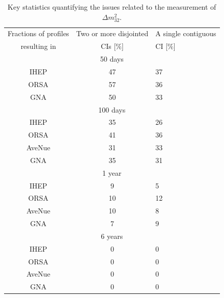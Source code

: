 \begin{table}[h!]
  \centering
  \caption{Key statistics quantifying the issues related to the measurement of $\Delta m^2_{32}$.}
  \label{tab:BadMinKeyStatistics}
  \vspace{10pt}
    \begin{tabular}{|c|c|l|}
\hline
    Fractions of profiles                    &  Two or more disjointed       &  A single contiguous      \\ 
    resulting in                             &  CIs [$\%$]        &    CI [$\%$]              \\ 
\hline
 \multicolumn{3}{|c|}{50 days} \\
IHEP         &       47        &          37                    \\ \hline
ORSA        &         57       &        36                        \\ \hline
GNA          &       50         &  33                               \\ 
\hline

\multicolumn{3}{|c|}{100 days} \\
IHEP         &       35       &          26                    \\ \hline
ORSA        &          41      &        36                        \\ \hline
AveNue          &      31          &      33                          \\ \hline
GNA          &        35        &       31                          \\ 
\hline

\multicolumn{3}{|c|}{1 year} \\
IHEP         &       9        &              5                 \\ \hline
ORSA        &          10      &             12                   \\ \hline
AveNue          &      10         &          8                      \\ \hline
GNA          &        7        &           9                      \\ 
\hline


\multicolumn{3}{|c|}{6 years} \\
IHEP         &         0      &                 0             \\ \hline
ORSA        &          0       &               0               \\ \hline
AveNue          &      0          &             0                    \\ \hline
GNA          &         0        &              0                    \\ 
\hline

%      
    \end{tabular}
\end{table}



